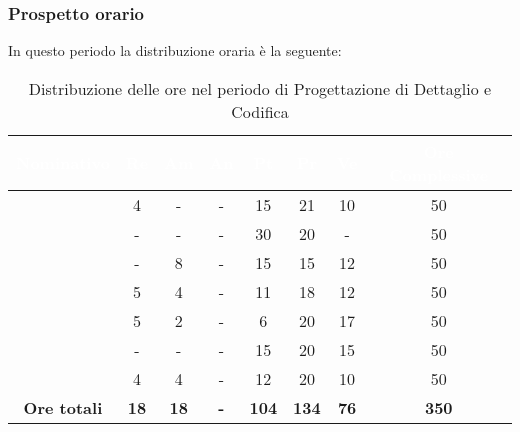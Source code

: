 \subsubsection{Prospetto orario}
In questo periodo la distribuzione oraria è la seguente:
\begin{table}[H]
	\begin{center}
		\begin{tabular}{ |c c c c c c c c| }
		\rowcolor{darkblue} 
		\textcolor{white}{\textbf{Nominativo}} & \textcolor{white}{\textbf{Re}} & \textcolor{white}{\textbf{Am}} & \textcolor{white}{\textbf{An}} & \textcolor{white}{\textbf{Pt}} & \textcolor{white}{\textbf{Pr}} & \textcolor{white}{\textbf{Ve}} & \textcolor{white}{\textbf{Ore Complessive}} \\ \hline
		\BL 	& 4  	& -  	& - 	& 15 	& 21 	& 10 	& 50 \\ \hline
		\FF 	& -  	& -  	& - 	& 30 	& 20 	& -  	& 50 \\ \hline
		\MM 	& -  	& 8  	& - 	& 15 	& 15 	& 12 	& 50 \\ \hline
		\PC 	& 5 	& 4  	& - 	& 11 	& 18 	& 12 	& 50 \\ \hline
		\TG 	& 5  	& 2	& - 	& 6 	& 20 	& 17 	& 50 \\ \hline
		\TL 	& -  	& - 	& - 	& 15 	& 20 	& 15 	& 50 \\ \hline
		\VD 	& 4  	& 4  	& - 	& 12 	& 20 	& 10 	& 50 \\ \hline
		\textbf{Ore totali} & \textbf{18} & \textbf{18} & \textbf{-} & \textbf{104} & \textbf{134} & \textbf{76} & \textbf{350} \\ \hline
		\end{tabular}
	\caption{Distribuzione delle ore nel periodo di Progettazione di Dettaglio e Codifica}
	\end{center}
\end{table}
